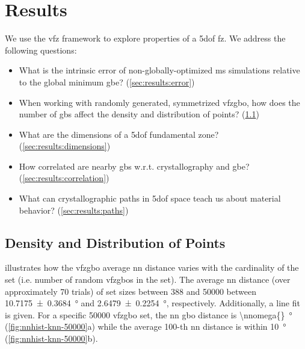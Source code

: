 \documentclass[final,twocolumn,12pt]{elsarticle}
\begin{document}
	
	\section{Results} \label{sec:results}
	
	We use the \gls{vfz} framework to explore properties of a \gls{5dof} \gls{fz}. We address the following questions:
	\begin{itemize}
		\item What is the intrinsic error of non-globally-optimized \gls{ms} simulations relative to the global minimum \gls{gbe}? (\cref{sec:results:error})
		\item When working with randomly generated, symmetrized \gls{vfzgbo}, how does the number of \glspl{gb} affect the density and distribution of points? (\cref{sec:results:density})
		\item What are the dimensions of a \gls{5dof} fundamental zone? (\cref{sec:results:dimensions})
		\item How correlated are nearby \glspl{gb} w.r.t. crystallography and \gls{gbe}? (\cref{sec:results:correlation})
		\item What can crystallographic paths in \gls{5dof} space teach us about material behavior? (\cref{sec:results:paths})
	\end{itemize}
	
	
	\subsection{Density and Distribution of Points} \label{sec:results:density}
	
	 illustrates how the \gls{vfzgbo} average \gls{nn} distance varies with the cardinality of the set (i.e. number of random \glspl{vfzgbo} in the set). The average \gls{nn} distance (over approximately 70 trials) of set sizes between \num{388} and \num{50000} between \SI{10.7175 \pm 0.3684}{\degree} and \SI{2.6479 \pm 0.2254}{\degree}, respectively. Additionally, a line fit is given. For a specific \num{50000} \gls{vfzgbo} set, the \gls{nn} \gls{gbo} distance is \SI{\nnomega{}}{\degree} (\cref{fig:nnhist-knn-50000}a) while the average 100-th \gls{nn} distance is within \SI{10}{\degree} (\cref{fig:nnhist-knn-50000}b).
	
\end{document}
